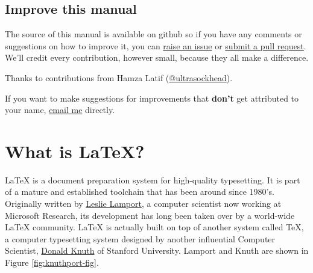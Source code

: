 \documentclass[
]{book}
\begin{document}
\hypertarget{improve-this-manual}{%
\section*{Improve this manual}\label{improve-this-manual}}

The source of this manual is available on github so if you have any comments or suggestions on how to improve it, you can \href{https://github.com/dullhunk/lateX4year1/issues}{raise an issue} or \href{https://github.com/dullhunk/LaTeX4year1/pulls}{submit a pull request}. We'll credit every contribution, however small, because they all make a difference.

Thanks to contributions from Hamza Latif (\href{https://github.com/ultrasockhead}{@ultrasockhead}).

If you want to make suggestions for improvements that \textbf{don't} get attributed to your name, \href{http://www.cs.man.ac.uk/~hulld/contact.html}{email me} directly.

\hypertarget{latex}{%
\chapter{What is LaTeX?}\label{latex}}

LaTeX is a document preparation system for high-quality typesetting. \citep{latexproject} It is part of a mature and established toolchain that has been around since 1980's. \citep{knuth} Originally written by \href{https://en.wikipedia.org/wiki/Leslie_Lamport}{Leslie Lamport}, a computer scientist
now working at Microsoft Research, its development has long been taken over by a world-wide LaTeX community. LaTeX is actually built on top of another system called TeX, a computer typesetting system designed by another influential Computer Scientist, \href{https://en.wikipedia.org/wiki/Donald_Knuth}{Donald Knuth} of Stanford University. Lamport and Knuth are shown in Figure \ref{fig:knuthport-fig}.
\end{document}
